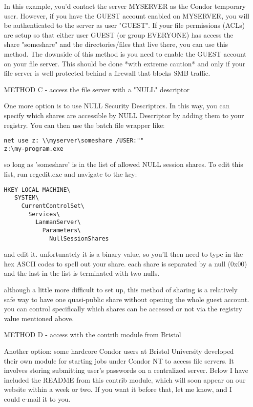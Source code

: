 In this example, you'd contact the server MYSERVER as the Condor temporary 
user.  However, if you have the GUEST account enabled on MYSERVER, you will 
be authenticated to the server as user "GUEST".  If your file permissions 
(ACLs) are setup so that either user GUEST (or group EVERYONE) has access 
the share "someshare" and the directories/files that live there, you can 
use this method.  The downside of this method is you need to enable the 
GUEST account on your file server.   \Warn This should be done *with 
extreme caution* and only if your file server is well protected behind a 
firewall that blocks SMB traffic.

METHOD C - access the file server with a "NULL" descriptor

One more option is to use NULL Security Descriptors.  In this way, you
can specify which shares are accessible by NULL Descriptor by adding
them to your registry.  You can then use the batch file wrapper like:

\begin{verbatim}
net use z: \\myserver\someshare /USER:""
z:\my-program.exe
\end{verbatim}

so long as 'someshare' is in the list of allowed NULL session shares.  To
edit this list, run regedit.exe and navigate to the key:

\begin{verbatim}
HKEY_LOCAL_MACHINE\
   SYSTEM\
     CurrentControlSet\
       Services\
         LanmanServer\
           Parameters\
             NullSessionShares
\end{verbatim}

and edit it.  unfortunately it is a binary value, so you'll then need to
type in the hex ASCII codes to spell out your share.  each share is
separated by a null (0x00) and the last in the list is terminated with
two nulls.

although a little more difficult to set up, this method of sharing is a
relatively safe way to have one quasi-public share without opening the
whole guest account.  you can control specifically which shares can be 
accessed or not via the registry value mentioned above.


METHOD D -  access with the contrib module from Bristol

Another option: some hardcore Condor users at Bristol University developed 
their own module for starting jobs under Condor NT to access file 
servers.  It involves storing submitting user's passwords on a centralized 
server.  Below I have included the README from this contrib module, which 
will soon appear on our website within a week or two.  If you want it 
before that, let me know, and I could e-mail it to you.

